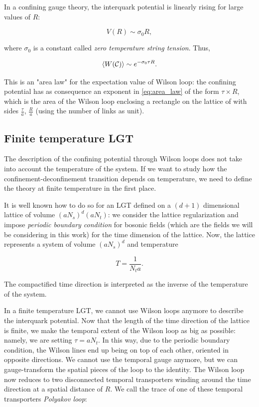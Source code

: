 \documentclass[reqno,12pt]{article}
\numberwithin{equation}{section}
\begin{document}
In a confining gauge theory, the interquark potential is linearly rising for large values of $R$: 

\begin{equation}
	V(R) \sim \sigma_0 R,
\end{equation}

where $\sigma_0$ is a constant called \textit{zero temperature string tension}. Thus,

\begin{equation} \label{eq:area_law}
	\expval{W(\mathcal{C})} \sim e^{-\sigma_0 \tau R}.
\end{equation}

This is an "area law" for the expectation value of Wilson loop: the confining potential has as consequence
an exponent in \eqref{eq:area_law} of the form $\tau \times R$, which is the area of the Wilson loop enclosing
a rectangle on the lattice of with sides $\frac{\tau}{a}$, $\frac{R}{a}$ (using the number of links as unit). 

\subsection{Finite temperature LGT} \label{finitetemperature}

The description of the confining potential through Wilson loops does not take into account the temperature of the system.
If we want to study how the confinement-deconfinement transition depends on temperature, we need to define the theory at finite
temperature in the first place. 

It is well known how to do so for an LGT defined on a $(d+1)$ dimensional lattice of volume $(aN_s)^d(aN_t)$:
we consider the lattice regularization and impose \textit{periodic boundary condition} 
for bosonic fields (which are the fields we will be considering in this work) for the time dimension of the lattice. 
Now, the lattice represents a system of volume $(aN_s)^d$ and temperature

\begin{equation} \label{eq:lattice_temperature}
	T = \frac{1}{N_t a}.
\end{equation}

The compactified time direction is interpreted as the inverse of the temperature of the system.

In a finite temperature LGT, we cannot use Wilson loops anymore to describe the interquark potential. Now that the 
length of the time direction of the lattice is finite, we make the temporal extent of the Wilson loop as big as possible:
namely, we are setting $\tau = aN_t$. In this way, due to the periodic boundary condition,
the Wilson lines end up being on top of each other, oriented in opposite directions. We cannot use the temporal gauge
anymore, but we can gauge-transform the spatial pieces of the loop to the identity. The Wilson loop now reduces to two 
disconnected temporal transporters winding around the time direction at a spatial distance of $R$. We call the trace of one
of these temporal transporters \textit{Polyakov loop}:
\end{document}
